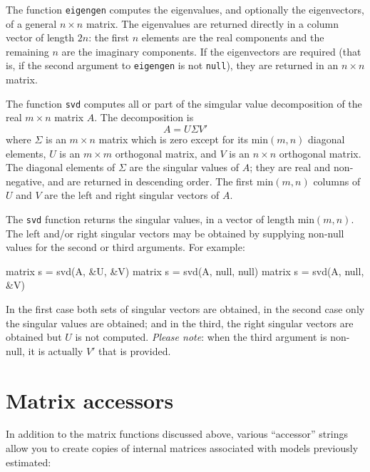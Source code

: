 The function \texttt{eigengen} computes the eigenvalues, and
optionally the eigenvectors, of a general $n \times n$ matrix.  The
eigenvalues are returned directly in a column vector of length $2n$:
the first $n$ elements are the real components and the remaining $n$
are the imaginary components.  If the eigenvectors are required (that
is, if the second argument to \texttt{eigengen} is not \texttt{null}),
they are returned in an $n \times n$ matrix.

The function \texttt{svd} computes all or part of the simgular value
decomposition of the real $m \times n$ matrix $A$.  The decomposition
is
\[
A = U \Sigma V'
\]
where $\Sigma$ is an $m \times n$ matrix which is zero except
for its $\mbox{min}(m, n)$ diagonal elements, $U$ is an $m \times m$
orthogonal matrix, and $V$ is an $n \times n$ orthogonal matrix.  The
diagonal elements of $\Sigma$ are the singular values of $A$; they are
real and non-negative, and are returned in descending order.  The
first $\mbox{min}(m, n)$ columns of $U$ and $V$ are the left and right
singular vectors of $A$.

The \texttt{svd} function returns the singular values, in a vector of
length $\mbox{min}(m, n)$.  The left and/or right singular vectors may
be obtained by supplying non-null values for the second or third
arguments.  For example:
%
\begin{code}
matrix s = svd(A, &U, &V)
matrix s = svd(A, null, null)
matrix s = svd(A, null, &V)
\end{code}
%
In the first case both sets of singular vectors are obtained, in the
second case only the singular values are obtained; and in the third,
the right singular vectors are obtained but $U$ is not computed.
\emph{Please note}: when the third argument is non-null, it is
actually $V'$ that is provided.


\section{Matrix accessors}
\label{matrix-accessors}

In addition to the matrix functions discussed above,
various ``accessor'' strings allow you to create copies of internal
matrices associated with models previously estimated:


